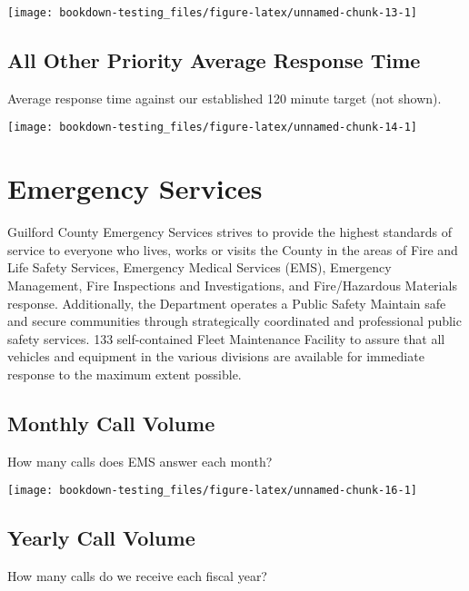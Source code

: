 \documentclass[]{book}
\begin{document}
\texttt{[image: bookdown-testing\_files/figure-latex/unnamed-chunk-13-1]}

\hypertarget{all-other-priority-average-response-time}{%
\section{All Other Priority Average Response Time}\label{all-other-priority-average-response-time}}

Average response time against our established 120 minute target (not shown).

\texttt{[image: bookdown-testing\_files/figure-latex/unnamed-chunk-14-1]}

\hypertarget{ems}{%
\chapter{Emergency Services}\label{ems}}

Guilford County Emergency Services strives to provide the highest standards of service to
everyone who lives, works or visits the County in the areas of Fire and Life Safety Services,
Emergency Medical Services (EMS), Emergency Management, Fire Inspections and
Investigations, and Fire/Hazardous Materials response. Additionally, the Department operates a
Public Safety
Maintain safe and secure communities through strategically coordinated and
professional public safety services.
133
self-contained Fleet Maintenance Facility to assure that all vehicles and equipment in the various
divisions are available for immediate response to the maximum extent possible.

\hypertarget{emsmonthlycallvolume}{%
\section{Monthly Call Volume}\label{emsmonthlycallvolume}}

How many calls does EMS answer each month?

\texttt{[image: bookdown-testing\_files/figure-latex/unnamed-chunk-16-1]}

\hypertarget{emsyearlycallvolume}{%
\section{Yearly Call Volume}\label{emsyearlycallvolume}}

How many calls do we receive each fiscal year?
\end{document}

